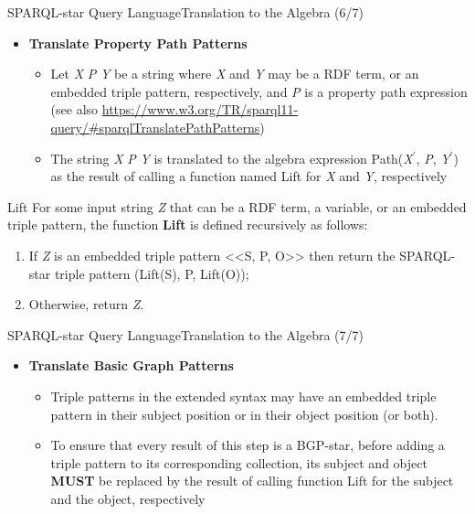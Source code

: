 \documentclass[aspectratio=169]{beamer}
\begin{document}
\begin{frame}{SPARQL-star Query Language}{Translation to the Algebra (6/7)}
    \begin{itemize}
        \item \textbf{Translate Property Path Patterns}
        \begin{itemize}
            \item Let \textit{X} \textit{P} \textit{Y} be a string where \textit{X} and \textit{Y} may be a RDF term, or an embedded triple pattern, respectively, and \textit{P} is a property path expression (see also \url{https://www.w3.org/TR/sparql11-query/\#sparqlTranslatePathPatterns})
            \item The string \textit{X} \textit{P} \textit{Y} is translated to the algebra expression Path(\textit{X}$^{\prime}$, \textit{P}, \textit{Y}$^\prime$) as the result of calling a function named Lift for \textit{X} and \textit{Y}, respectively
        \end{itemize}
    \end{itemize}
    \begin{block}{Lift}
    For some input string \textit{Z} that can be a RDF term, a variable, or an embedded triple pattern, the function \textbf{Lift} is defined recursively as follows:
    \begin{enumerate}
        \item If \textit{Z} is an embedded triple pattern <<S, P, O>> then return the SPARQL-star triple pattern (Lift(S), P, Lift(O));
        \item Otherwise, return \textit{Z}.
    \end{enumerate}
    \end{block}
\end{frame}

\begin{frame}{SPARQL-star Query Language}{Translation to the Algebra (7/7)}
    \begin{itemize}
        \item \textbf{Translate Basic Graph Patterns}
        \begin{itemize}
            \item Triple patterns in the extended syntax may have an embedded triple pattern in their subject position or in their object position (or both).
            \item To ensure that every result of this step is a BGP-star, before adding a triple pattern to its corresponding collection, its subject and object \textbf{MUST} be replaced by the result of calling function Lift for the subject and the object, respectively
        \end{itemize}
    \end{itemize}
\end{frame}
\end{document}
